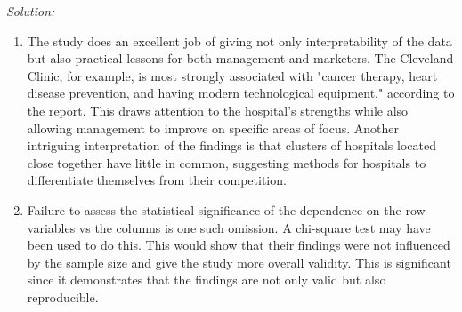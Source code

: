\documentclass{article}
\newenvironment{solution}
    {\textit{Solution:}}
    {}
\begin{document}
\begin{solution}
\begin{enumerate}
	\item The study does an excellent job of giving not only interpretability of the data but also practical lessons for both management and marketers. The Cleveland Clinic, for example, is most strongly associated with "cancer therapy, heart disease prevention, and having modern technological equipment," according to the report. This draws attention to the hospital's strengths while also allowing management to improve on specific areas of focus. Another intriguing interpretation of the findings is that clusters of hospitals located close together have little in common, suggesting methods for hospitals to differentiate themselves from their competition.
	\item Failure to assess the statistical significance of the dependence on the row variables vs the columns is one such omission. A chi-square test may have been used to do this. This would show that their findings were not influenced by the sample size and give the study more overall validity. This is significant since it demonstrates that the findings are not only valid but also reproducible.
\end{enumerate}
\end{solution}
\end{document}
